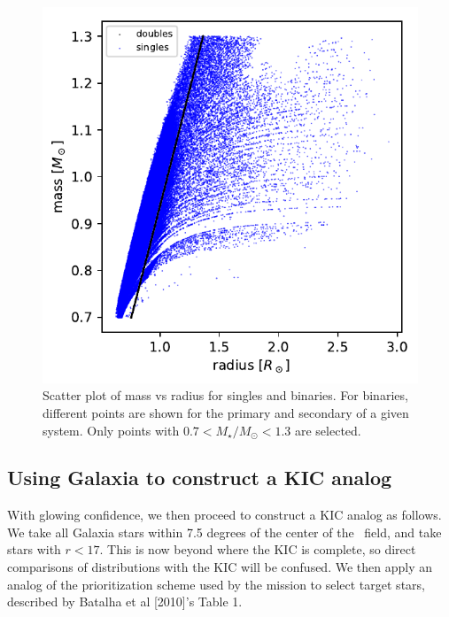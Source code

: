 \documentclass{emulateapj}
\begin{document}
\begin{figure}[!t]
	\begin{center}
		\includegraphics[scale=.8]{figures/galaxia_compare_mass_radius.pdf}
	\end{center}
	\caption{Scatter plot of mass vs radius for singles and binaries. For 
	binaries, different points are shown for the primary and secondary of a 
	given system. Only points with $0.7<M_\star/M_\odot<1.3$ are selected.}
	\label{fig:galaxia_mass_radius}
\end{figure}


\subsection{Using Galaxia to construct a KIC analog}

With glowing confidence, we then proceed to construct a KIC analog as follows.
We take all Galaxia stars within 7.5 degrees of the center of the \kepler\ 
field, and take stars with $r<17$.
This is now beyond where the KIC is complete, so direct comparisons of 
distributions with the KIC will be confused.
We then apply an analog of the prioritization scheme used by the \kepler 
mission to select target stars, described by Batalha et al [2010]'s Table 1. 
\end{document}
